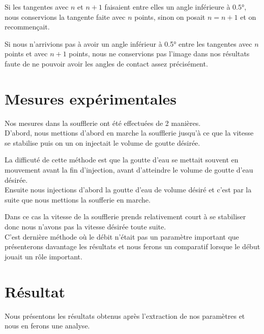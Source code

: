 \documentclass[french]{article}
\begin{document}
Si les tangentes avec $n$ et $n+1$ faisaient entre elles un angle inférieure à $\ang{0.5}$, nous conservions la tangente faite avec $n$ points, sinon on posait $n = n+1$ et on recommençait.

Si nous n'arrivions pas à avoir un angle inférieur à \ang{0.5}  entre les tangentes avec $n$ points et avec $n+1$ points, nous ne conservions pas l'image dans nos résultats faute de ne pouvoir avoir les angles de contact assez précisément.

\newpage
\section{Mesures expérimentales}

Nos mesures dans la soufflerie ont été effectuées de 2 manières.\\

D'abord, nous mettions d'abord en marche la soufflerie jusqu'à ce que la vitesse se stabilise puis on un on injectait le volume de goutte désirée.

La difficuté de cette méthode est que la goutte d'eau se mettait souvent en mouvement avant la fin d'injection, avant d'atteindre le volume de goutte d'eau désirée.\\

Ensuite nous injections d'abord la goutte d'eau de volume désiré et c'est par la suite que nous mettions la soufferie en marche.

Dans ce cas la vitesse de la soufflerie prends relativement court à se stabiliser donc nous n'avons pas la vitesse désirée toute suite.\\

C'est dernière méthode où le débit n'était pas un paramètre important que présenterons davantage les résultats et nous ferons un comparatif lorsque le début jouait un rôle important.

\newpage
\section{Résultat}

Nous présentons les résultats obtenus après l'extraction de nos paramètres et nous en ferons une analyse.
\end{document}
